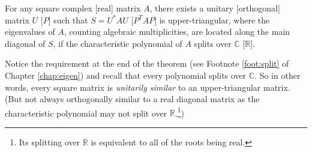 \begin{thm}
\label{thm:schurtrig}
For any square complex [real] matrix $A$, there exists a unitary [orthogonal] matrix $U$ [$P$] such that $S = U^*AU$ [$P^TAP$] is upper-triangular, where the eigenvalues of $A$, counting algebraic multiplicities, are located along the main diagonal of $S$, if the characteristic polynomial of $A$ splits over $\mathbb{C}$ [$\mathbb{R}$].
\end{thm}
Notice the requirement at the end of the theorem (see Footnote \ref{foot:split} of Chapter \ref{chap:eigen}) and recall that every polynomial splits over $\mathbb{C}$. So in other words, every square matrix is \textit{unitarily similar} to an upper-triangular matrix. (But not always orthogonally similar to a real diagonal matrix as the characteristic polynomial may not split over $\mathbb{R}$.\footnote{Its splitting over $\mathbb{R}$ is equivalent to all of the roots being real.})
